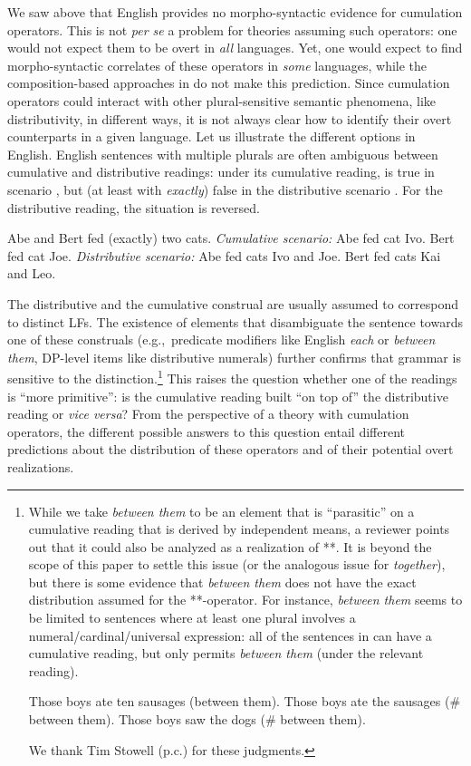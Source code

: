 \documentclass[output=paper]{langscibook}
\begin{document}
We saw above that English provides no morpho-syntactic evidence for cumulation operators. This is not \textit{per se} a problem for theories assuming such operators: one would not expect them to be overt in \textit{all} languages. Yet, one would expect to find morpho-syntactic correlates of these operators in \textit{some} languages, while the composition-based approaches in  do not make this prediction. 
Since cumulation operators could interact with other plural-sensitive semantic phenomena, like distributivity, in different ways, it is not always clear how to identify their overt counterparts in a given language. Let us illustrate the different options in English. English sentences with multiple plurals are often ambiguous between cumulative and distributive readings: under its cumulative reading,  is true in scenario , but (at least with \textit{exactly}) false in the distributive scenario . For the distributive reading, the situation is reversed.

\ea \label{has-sch:11} Abe and Bert fed (exactly) two cats.
\ea \label{has-sch:11a} \textit{Cumulative scenario:} Abe fed cat Ivo. Bert fed cat Joe.
\ex \label{has-sch:11b} \textit{Distributive scenario:} Abe fed cats Ivo and Joe. Bert fed cats Kai and Leo. \z
\z

\noindent The distributive and the cumulative construal are usually assumed to correspond to distinct LFs. The existence of elements that disambiguate the sentence towards one of these construals (e.g.,~predicate modifiers like English \textit{each} or \textit{between them}, DP-level items like distributive numerals) further confirms that grammar is sensitive to the distinction.\footnote{While we take \textit{between them} to be an element that is ``parasitic'' on a cumulative reading that is derived by independent means, a reviewer points out that it could also be analyzed as a realization of **. It is beyond the scope of this paper to settle this issue (or the analogous issue for \textit{together}), but there is some evidence that \textit{between them} does not have the exact distribution assumed for the **-operator. For instance, \textit{between them} seems to be limited to sentences where at least one plural involves a numeral/cardinal/universal expression: all of the sentences in  can have a cumulative reading, but only  permits \textit{between them} (under the relevant reading). 

\ea \label{has-sch:num}
\ea \label{has-sch:numa} Those boys ate ten sausages (between them).
\ex Those boys ate the sausages ($\#$ between them).
\ex Those boys saw the dogs ($\#$ between them).
\z\z

\noindent We thank Tim Stowell (p.c.) for these judgments.} This raises the question whether one of the readings is ``more primitive'': is the cumulative reading built ``on top of'' the distributive reading or \textit{vice versa}? From the perspective of a theory with cumulation operators, the different possible answers to this question entail different predictions about the distribution of these operators and of their potential overt realizations.
\end{document}
